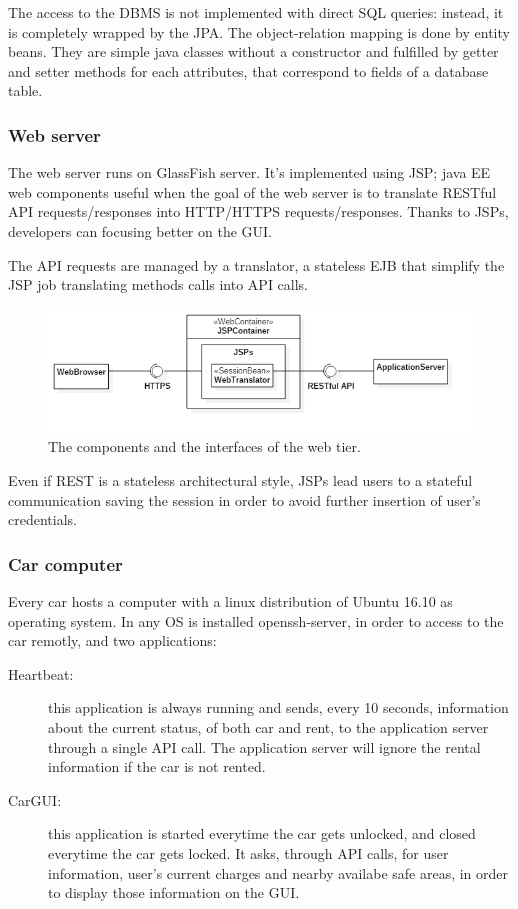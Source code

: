 The access to the DBMS is not implemented with direct SQL queries: instead, it is completely wrapped by the JPA. The object-relation mapping is done by entity beans. They are simple java classes without a constructor and fulfilled by getter and setter methods for each attributes, that correspond to fields of a database table.

\subsubsection{Web server}

The web server runs on GlassFish server. It's implemented using JSP; java EE web components useful when the goal of the web server is to translate RESTful API requests/responses into  HTTP/HTTPS requests/responses. Thanks to JSPs, developers can focusing better on the GUI.

The API requests are managed by a translator, a stateless EJB that simplify the JSP job translating methods calls into API calls.


\begin{figure}[H]
	\centering
	\includegraphics[width=\textwidth, keepaspectratio]{diagrams/WebComponents.png}
	\caption{The components and the interfaces of the web tier.}
	\label {fig:web-components}
\end{figure}

Even if REST is a stateless architectural style, JSPs lead users to a stateful communication saving the session in order to avoid further insertion of user's credentials.

\subsubsection{Car computer}

Every car hosts a computer with a linux distribution of Ubuntu 16.10 as operating system. In any OS is installed openssh-server, in order to access to the car remotly, and two applications:
\begin{description}
	\item[Heartbeat:] this application is always running and sends, every 10 seconds, information about the current status, of both car and rent, to the application server through a single API call. The application server will ignore the rental information if the car is not rented.
	\item[CarGUI:] this application is started everytime the car gets unlocked, and closed everytime the car gets locked. It asks, through API calls, for user information, user's current charges and nearby availabe safe areas, in order to display those information on the GUI.
\end{description}

